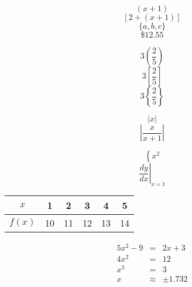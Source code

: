 \documentclass[11pt]{article}
\begin{document}
$$(x+1)$$
$$[2+(x+1)]$$
$$\{a,b,c\}$$ %
$$\$12.55$$

$$3\left(\frac{2}{5}\right)$$ %
$$3\left[\frac{2}{5}\right]$$
$$3\left\{\frac{2}{5}\right\}$$

$$|x|$$
$$\left|\frac{x}{x+1}\right|$$

$$\left\{x^2\right.$$
$$\left. \frac{dy}{dx} \right|_{x=1}$$ %

\begin{tabular}{|c|c|c|c|c|c|} %
\hline
$x$ & 1 & 2 & 3 & 4 & 5 \\ \hline %
$f(x)$ & 10 & 11 & 12 & 13 & 14 \\ \hline
\end{tabular}

\begin{eqnarray*} %
5x^2-9&=&2x+3\\ %
4x^2&=&12\\
x^3&=&3\\
x&\approx&\pm1.732
\end{eqnarray*} %
\end{document}

